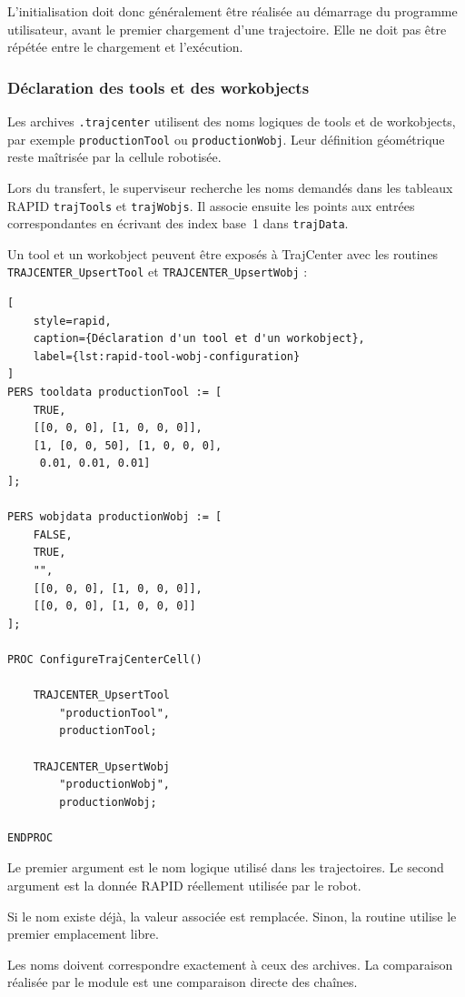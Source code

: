 \documentclass{rapportENSAM}
\begin{document}
L'initialisation doit donc généralement être réalisée au démarrage du programme
utilisateur, avant le premier chargement d'une trajectoire. Elle ne doit pas
être répétée entre le chargement et l'exécution.


\subsubsection{Déclaration des tools et des workobjects}
\label{subsubsec:rapid-tools-wobjs}

Les archives \texttt{.trajcenter} utilisent des noms logiques de tools et de
workobjects, par exemple \texttt{productionTool} ou
\texttt{productionWobj}. Leur définition géométrique reste maîtrisée par la
cellule robotisée.

Lors du transfert, le superviseur recherche les noms demandés dans les tableaux
RAPID \texttt{trajTools} et \texttt{trajWobjs}. Il associe ensuite les points
aux entrées correspondantes en écrivant des index base~1 dans
\texttt{trajData}.

Un tool et un workobject peuvent être exposés à TrajCenter avec les routines
\texttt{TRAJCENTER\_UpsertTool} et
\texttt{TRAJCENTER\_UpsertWobj} :

\begin{lstlisting}[
    style=rapid,
    caption={Déclaration d'un tool et d'un workobject},
    label={lst:rapid-tool-wobj-configuration}
]
PERS tooldata productionTool := [
    TRUE,
    [[0, 0, 0], [1, 0, 0, 0]],
    [1, [0, 0, 50], [1, 0, 0, 0],
     0.01, 0.01, 0.01]
];

PERS wobjdata productionWobj := [
    FALSE,
    TRUE,
    "",
    [[0, 0, 0], [1, 0, 0, 0]],
    [[0, 0, 0], [1, 0, 0, 0]]
];

PROC ConfigureTrajCenterCell()

    TRAJCENTER_UpsertTool
        "productionTool",
        productionTool;

    TRAJCENTER_UpsertWobj
        "productionWobj",
        productionWobj;

ENDPROC
\end{lstlisting}

Le premier argument est le nom logique utilisé dans les trajectoires. Le
second argument est la donnée RAPID réellement utilisée par le robot.

Si le nom existe déjà, la valeur associée est remplacée. Sinon, la routine
utilise le premier emplacement libre.

Les noms doivent correspondre exactement à ceux des archives. La comparaison
réalisée par le module est une comparaison directe des chaînes.
\end{document}
